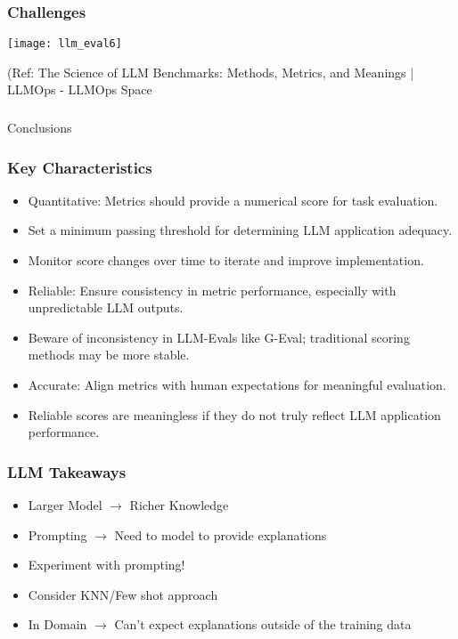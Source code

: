 \begin{frame}[fragile]\frametitle{Challenges}

\begin{center}
\texttt{[image: llm\_eval6]}
\end{center}		
		
{\tiny (Ref: The Science of LLM Benchmarks: Methods, Metrics, and Meanings | LLMOps - LLMOps Space}
			
			
\end{frame}

\begin{frame}[fragile]\frametitle{}
\begin{center}
{\Large Conclusions}
\end{center}
\end{frame}


\begin{frame}[fragile]\frametitle{Key Characteristics}
  \begin{itemize}
    \item Quantitative: Metrics should provide a numerical score for task evaluation.
    \item Set a minimum passing threshold for determining LLM application adequacy.
    \item Monitor score changes over time to iterate and improve implementation.
    \item Reliable: Ensure consistency in metric performance, especially with unpredictable LLM outputs.
    \item Beware of inconsistency in LLM-Evals like G-Eval; traditional scoring methods may be more stable.
    \item Accurate: Align metrics with human expectations for meaningful evaluation.
    \item Reliable scores are meaningless if they do not truly reflect LLM application performance.
  \end{itemize}
\end{frame}

\begin{frame}[fragile]\frametitle{LLM Takeaways}

  \begin{itemize}
  \item Larger Model $\rightarrow$ Richer Knowledge
  \item Prompting $\rightarrow$  Need to model to provide explanations
  \item Experiment with prompting!
  \item Consider KNN/Few shot approach
  \item In Domain $\rightarrow$  Can’t expect explanations outside of the training data
  \end{itemize}
\end{frame}